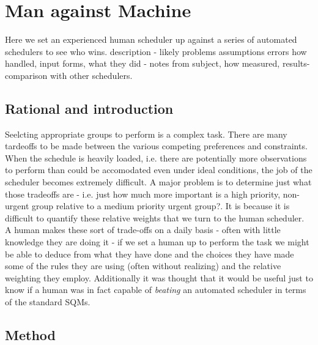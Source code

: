 \section{Man against Machine}
\label{sect:mam_study}
Here we set an experienced human scheduler up against a series of automated schedulers to see who wins.
description - likely problems assumptions errors how handled, input forms, what they did - notes from subject, how measured, results-comparison with other schedulers.

\subsection{Rational and introduction}
Seelcting appropriate groups to perform is a complex task. There are many tardeoffs to be made between the various competing preferences and constraints. When the schedule is heavily loaded, i.e. there are potentially more observations to perform than could be accomodated even under ideal conditions, the job of the scheduler becomes extremely difficult. A major problem is to determine just what those tradeoffs are - i.e. just how much more important is a high priority, non-urgent group relative to a medium priority urgent group?. It is because it is difficult to quantify these relative weights that we turn to the human scheduler. A human makes these sort of trade-offs on a daily basis - often with little knowledge they are doing it - if we set a human up to perform the task we might be able to deduce from what they have done and the choices they have made some of the rules they are using (often without realizing) and the relative weighting they employ. Additionally it was thought that it would be useful just to know if a human was in fact capable of \emph{beating} an automated scheduler in terms of the standard SQMs.

\subsection{Method}

\clearpage

